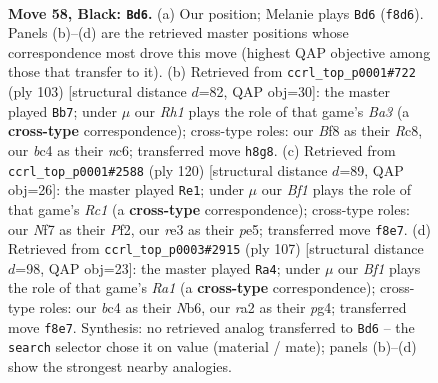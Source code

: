 \documentclass[11pt]{article}
\begin{document}
\clearpage

\begin{figure}[p]\centering
\begin{subfigure}{0.46\textwidth}\centering
\resizebox{\linewidth}{!}{%
\newchessgame
\chessboard[
  setfen={5b1r/p4nkp/P7/2r5/2B2B2/1Pp1R1KP/R1P3P1/8 b - - 24 58},
  showmover=false,
  pgfstyle=straightmove, color=movearrow, markmove={f8-d6}
]}
\caption{}
\end{subfigure}\hfill
\begin{subfigure}{0.46\textwidth}\centering
\resizebox{\linewidth}{!}{%
\newchessgame
\chessboard[
  setfen={2r5/2r3k1/b1N2pp1/p2P4/P1P4p/1BR4P/5PP1/6K1 b - - 1 52},
  showmover=false,
  pgfstyle=straightmove, color=movearrow, markmove={a6-b7}
]}
\caption{}
\end{subfigure}
\\[4pt]
\begin{subfigure}{0.46\textwidth}\centering
\resizebox{\linewidth}{!}{%
\newchessgame
\chessboard[
  setfen={8/2B3p1/p3rk1p/PbR1p3/8/7P/3r1PP1/2R3K1 w - - 54 61},
  showmover=false,
  pgfstyle=straightmove, color=movearrow, markmove={c1-e1}
]}
\caption{}
\end{subfigure}\hfill
\begin{subfigure}{0.46\textwidth}\centering
\resizebox{\linewidth}{!}{%
\newchessgame
\chessboard[
  setfen={r3k3/5p2/1nR3p1/1P4P1/6P1/2PB4/2KB4/6b1 b - - 14 54},
  showmover=false,
  pgfstyle=straightmove, color=movearrow, markmove={a8-a4}
]}
\caption{}
\end{subfigure}
\caption{\textbf{Move 58, Black: \texttt{Bd6}.} (a) Our position; Melanie plays \texttt{Bd6} (\texttt{f8d6}). Panels (b)--(d) are the retrieved master positions whose correspondence most drove this move (highest QAP objective among those that transfer to it). (b) Retrieved from \texttt{ccrl\_top\_p0001\#722} (ply 103) [structural distance $d$=82, QAP obj=30]: the master played \texttt{Bb7}; under $\mu$ our \emph{Rh1} plays the role of that game's \emph{Ba3} (a \textbf{cross-type} correspondence); cross-type roles: our \emph{B}f8 as their \emph{R}c8, our \emph{b}c4 as their \emph{n}c6; transferred move \texttt{h8g8}. (c) Retrieved from \texttt{ccrl\_top\_p0001\#2588} (ply 120) [structural distance $d$=89, QAP obj=26]: the master played \texttt{Re1}; under $\mu$ our \emph{Bf1} plays the role of that game's \emph{Rc1} (a \textbf{cross-type} correspondence); cross-type roles: our \emph{N}f7 as their \emph{P}f2, our \emph{r}e3 as their \emph{p}e5; transferred move \texttt{f8e7}. (d) Retrieved from \texttt{ccrl\_top\_p0003\#2915} (ply 107) [structural distance $d$=98, QAP obj=23]: the master played \texttt{Ra4}; under $\mu$ our \emph{Bf1} plays the role of that game's \emph{Ra1} (a \textbf{cross-type} correspondence); cross-type roles: our \emph{b}c4 as their \emph{N}b6, our \emph{r}a2 as their \emph{p}g4; transferred move \texttt{f8e7}. Synthesis: no retrieved analog transferred to \texttt{Bd6} -- the \texttt{search} selector chose it on value (material / mate); panels (b)--(d) show the strongest nearby analogies.}
\label{fig:thought-m115}
\end{figure}
\end{document}
